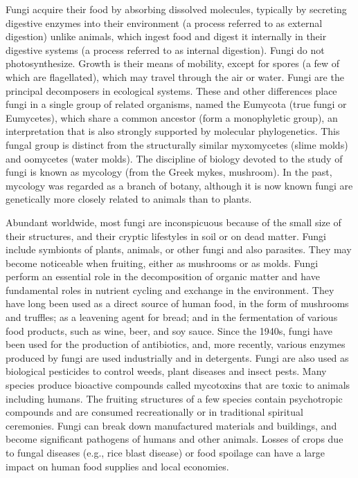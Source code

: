 \documentclass[]{book}
\theoremstyle{definition}
\theoremstyle{definition}
\theoremstyle{definition}
\theoremstyle{remark}
\begin{document}
Fungi acquire their food by absorbing dissolved molecules, typically by
secreting digestive enzymes into their environment (a process referred
to as external digestion) unlike animals, which ingest food and digest
it internally in their digestive systems (a process referred to as
internal digestion). Fungi do not photosynthesize. Growth is their means
of mobility, except for spores (a few of which are flagellated), which
may travel through the air or water. Fungi are the principal decomposers
in ecological systems. These and other differences place fungi in a
single group of related organisms, named the Eumycota (true fungi or
Eumycetes), which share a common ancestor (form a monophyletic group),
an interpretation that is also strongly supported by molecular
phylogenetics. This fungal group is distinct from the structurally
similar myxomycetes (slime molds) and oomycetes (water molds). The
discipline of biology devoted to the study of fungi is known as mycology
(from the Greek mykes, mushroom). In the past, mycology was regarded as
a branch of botany, although it is now known fungi are genetically more
closely related to animals than to plants.

Abundant worldwide, most fungi are inconspicuous because of the small
size of their structures, and their cryptic lifestyles in soil or on
dead matter. Fungi include symbionts of plants, animals, or other fungi
and also parasites. They may become noticeable when fruiting, either as
mushrooms or as molds. Fungi perform an essential role in the
decomposition of organic matter and have fundamental roles in nutrient
cycling and exchange in the environment. They have long been used as a
direct source of human food, in the form of mushrooms and truffles; as a
leavening agent for bread; and in the fermentation of various food
products, such as wine, beer, and soy sauce. Since the 1940s, fungi have
been used for the production of antibiotics, and, more recently, various
enzymes produced by fungi are used industrially and in detergents. Fungi
are also used as biological pesticides to control weeds, plant diseases
and insect pests. Many species produce bioactive compounds called
mycotoxins that are toxic to animals including humans. The fruiting
structures of a few species contain psychotropic compounds and are
consumed recreationally or in traditional spiritual ceremonies. Fungi
can break down manufactured materials and buildings, and become
significant pathogens of humans and other animals. Losses of crops due
to fungal diseases (e.g., rice blast disease) or food spoilage can have
a large impact on human food supplies and local economies.
\end{document}
